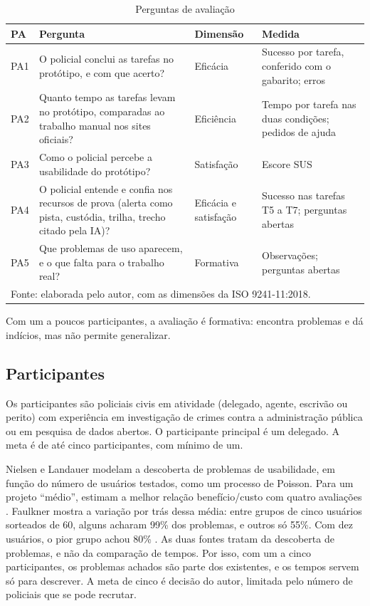 \begin{table}[htbp]
\centering
\caption{Perguntas de avaliação}
\label{tab:avaliacao-pa}
\small
\begin{tabular}{p{0.8cm}p{6.6cm}p{2.4cm}p{4.2cm}}
\hline
\textbf{PA} & \textbf{Pergunta} & \textbf{Dimensão} & \textbf{Medida} \\ \hline
PA1 & O policial conclui as tarefas no protótipo, e com que acerto? & Eficácia & Sucesso por tarefa, conferido com o gabarito; erros \\
PA2 & Quanto tempo as tarefas levam no protótipo, comparadas ao trabalho manual nos sites oficiais? & Eficiência & Tempo por tarefa nas duas condições; pedidos de ajuda \\
PA3 & Como o policial percebe a usabilidade do protótipo? & Satisfação & Escore SUS \\
PA4 & O policial entende e confia nos recursos de prova (alerta como pista, custódia, trilha, trecho citado pela IA)? & Eficácia e satisfação & Sucesso nas tarefas T5 a T7; perguntas abertas \\
PA5 & Que problemas de uso aparecem, e o que falta para o trabalho real? & Formativa & Observações; perguntas abertas \\ \hline
\multicolumn{4}{p{14.4cm}}{\footnotesize Fonte: elaborada pelo autor, com as dimensões da ISO 9241-11:2018.}\\
\end{tabular}
\end{table}

Com um a poucos participantes, a avaliação é formativa: encontra problemas e
dá indícios, mas não permite generalizar.

\subsection{Participantes}
\label{sec:avaliacao-participantes}

Os participantes são policiais civis em atividade (delegado, agente,
escrivão ou perito) com experiência em investigação de crimes contra a
administração pública ou em pesquisa de dados abertos. O participante
principal é um delegado. A meta é de até cinco participantes, com mínimo de
um.

Nielsen e Landauer modelam a descoberta de problemas de usabilidade, em
função do número de usuários testados, como um processo de Poisson. Para um
projeto ``médio'', estimam a melhor relação benefício/custo com quatro
avaliações \cite{nielsen1993}. Faulkner mostra a variação por trás dessa
média: entre grupos de cinco usuários sorteados de 60, alguns acharam 99\%
dos problemas, e outros só 55\%. Com dez usuários, o pior grupo achou 80\%
\cite{faulkner2003}. As duas fontes tratam da descoberta de problemas, e não
da comparação de tempos. Por isso, com um a cinco participantes, os
problemas achados são parte dos existentes, e os tempos servem só para
descrever. A meta de cinco é decisão do autor, limitada pelo número de
policiais que se pode recrutar.

